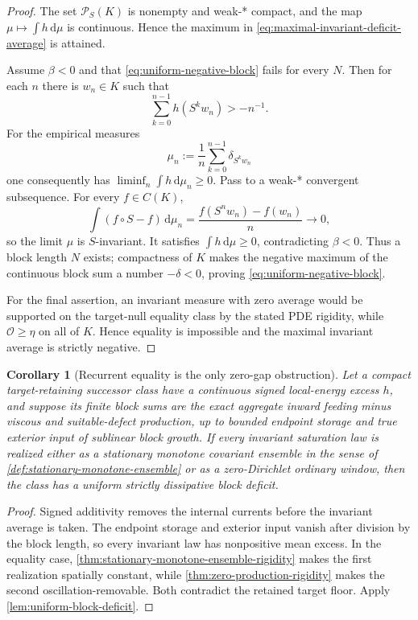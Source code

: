 \documentclass[11pt]{amsart}
\numberwithin{equation}{section}
\theoremstyle{plain}
\newtheorem{corollary}[corollary]{Corollary}
\theoremstyle{definition}
\theoremstyle{remark}
\newcommand{\dd}{\,\mathrm d}
\begin{document}
\begin{proof}
The set \(\mathcal P_S(K)\) is nonempty and weak-* compact, and the map
\(\mu\mapsto\int h\dd\mu\) is continuous.  Hence the maximum in
\eqref{eq:maximal-invariant-deficit-average} is attained.

Assume \(\beta<0\) and that \eqref{eq:uniform-negative-block} fails for
every \(N\).  Then for each \(n\) there is \(w_n\in K\) such that
\[
 \sum_{k=0}^{n-1}h(S^kw_n)>-n^{-1}.
\]
For the empirical measures
\[
 \mu_n:=\frac1n\sum_{k=0}^{n-1}\delta_{S^kw_n}
\]
one consequently has \(\liminf_n\int h\dd\mu_n\ge0\).  Pass to a
weak-* convergent subsequence.  For every \(f\in C(K)\),
\[
 \int(f\circ S-f)\dd\mu_n
 =\frac{f(S^nw_n)-f(w_n)}n\longrightarrow0,
\]
so the limit \(\mu\) is \(S\)-invariant.  It satisfies
\(\int h\dd\mu\ge0\), contradicting \(\beta<0\).  Thus a block length
\(N\) exists; compactness of \(K\) makes the negative maximum of the
continuous block sum a number \(-\delta<0\), proving
\eqref{eq:uniform-negative-block}.

For the final assertion, an invariant measure with zero average would be
supported on the target-null equality class by the stated PDE rigidity, while
\(\mathcal O\ge\eta\) on all of \(K\).  Hence equality is impossible and
the maximal invariant average is strictly negative.
\end{proof}

\begin{corollary}[Recurrent equality is the only zero-gap obstruction]
\label{cor:recurrent-equality-only-obstruction}
Let a compact target-retaining successor class have a continuous signed
local-energy excess \(h\), and suppose its finite block sums are the exact
aggregate inward feeding minus viscous and suitable-defect production, up to
bounded endpoint storage and true exterior input of sublinear block growth.
If every invariant saturation law is realized either as a stationary
monotone covariant ensemble in the sense of
\cref{def:stationary-monotone-ensemble} or as a zero-Dirichlet ordinary
window, then the class has a uniform strictly dissipative block deficit.
\end{corollary}

\begin{proof}
Signed additivity removes the internal currents before the invariant average
is taken.  The endpoint storage and exterior input vanish after division by
the block length, so every invariant law has nonpositive mean excess.  In the
equality case, \cref{thm:stationary-monotone-ensemble-rigidity} makes the
first realization spatially constant, while
\cref{thm:zero-production-rigidity} makes the second oscillation-removable.
Both contradict the retained target floor.  Apply
\cref{lem:uniform-block-deficit}.
\end{proof}
\end{document}
